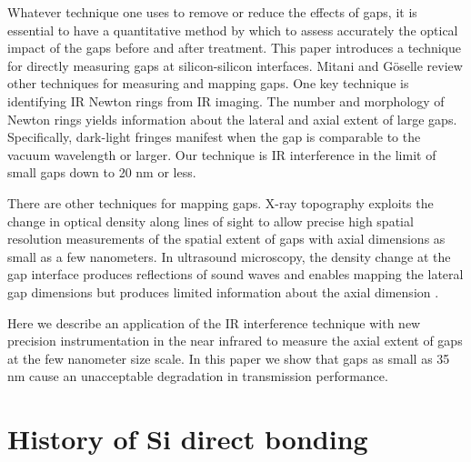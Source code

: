 \documentclass[osajnl,preprint,showpacs,superscriptaddress,12pt]{revtex4-1} %
\begin{document}
Whatever technique one uses to remove or reduce the effects of gaps, it is essential to have a quantitative method by which to assess accurately the optical impact of the gaps before and after treatment.  This paper introduces a technique for directly measuring gaps at silicon-silicon interfaces.  Mitani and G\"oselle review other techniques for measuring and mapping gaps\cite{1992JEMat..21..669M}.  One key technique is identifying IR Newton rings from IR imaging\cite{Mitani1990}.  The number and morphology of Newton rings yields information about the lateral and axial extent of large gaps. Specifically, dark-light fringes manifest when the gap is comparable to the vacuum wavelength or larger.  Our technique is IR interference in the limit of small gaps down to 20 nm or less.  

There are other techniques for mapping gaps.  X-ray topography \cite{1992JEMat..21..669M,1994JaJAP..33....6H} exploits the change in optical density along lines of sight to allow precise high spatial resolution measurements of the spatial extent of gaps with axial dimensions as small as a few nanometers.  In ultrasound microscopy, the density change at the gap interface produces reflections of sound waves and enables mapping the lateral gap dimensions but produces limited information about the axial dimension \cite{2000RScI...71.1869G}.  

Here we describe an application of the IR interference technique with new precision instrumentation in the near infrared to measure the axial extent of gaps at the few nanometer size scale.  In this paper we show that gaps as small as 35 nm cause an unacceptable degradation in transmission performance.  


\section{History of Si direct bonding}
\label{secHistory}
\end{document}

